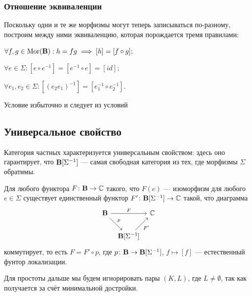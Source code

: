 \documentclass[10pt, twoside]{article}
\begin{document}
\subsubsection{Отношение эквиваленции}
Поскольку одни и те же морфизмы могут теперь записываться по-разному, построим между ними эквиваленцию, которая порождается тремя правилами:
\begin{conditions}
    \item \label{equal1} $\forall f, g \in \operatorname{Mor}(\mathbf{B}): h = fg \implies [h] = [f \circ g];$
    \item \label{equal2} $\forall e \in \Sigma: [e \circ e^{-1}] = [e^{-1} \circ e] = [id];$
    \item \label{equal3} $\forall e_1, e_2 \in \Sigma: [(e_2 e_1)^{-1}] = [e_1^{-1} \circ e_2^{-1}].$
\end{conditions}
\begin{remark}
    Условие  избыточно и следует из условий 
\end{remark}

\subsection{Универсальное свойство}
Категория частных характеризуется универсальным свойством: здесь оно гарантирует, что $\mathbf{B}[\Sigma^{-1}]$ --- самая свободная категория из тех, где морфизмы $\Sigma$ обратимы.

\begin{proposition}
    Для любого функтора $F \colon \mathbf{B} \to \mathbb C$ такого, что $F(e)$ --- изоморфизм для любого $e \in \Sigma$ существует единственный функтор $F' \colon \mathbf{B}[\Sigma^{-1}] \to \mathbb C$ такой, что диаграмма
    \begin{equation}
        \begin{tikzcd}[column sep = tiny]
            \B \drar["p"] \arrow[rr, "F"] & & \C \\
            & \B[\Sigma^{-1}] \urar["F'", swap]  
        \end{tikzcd}
    \end{equation}
    коммутирует, то есть $F = F' \circ p$,  где $p \colon \mathbf{B} \to \mathbf{B}[\Sigma^{-1}]$, $f \mapsto [f]$ --- естественный фунтор локализации.
\end{proposition}

Для простоты дальше мы будем игнорировать пары $(K, L)$, где $L \neq \emptyset$, так как  получается за счёт минимальной достройки.
\end{document}
